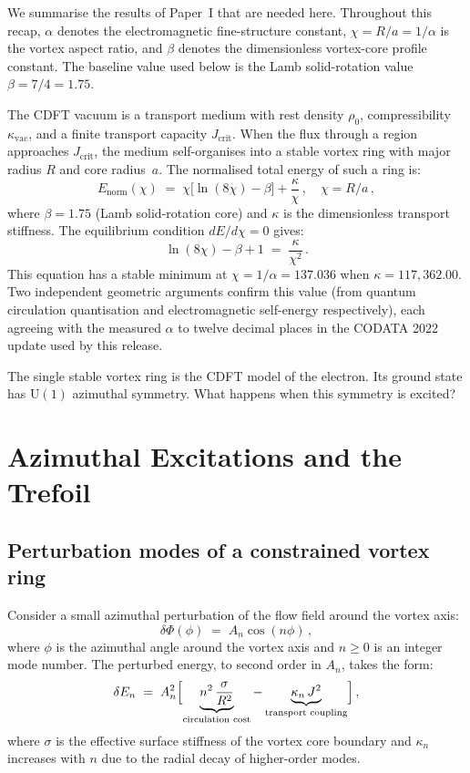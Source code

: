 \documentclass[11pt]{article}
\begin{document}
We summarise the results of Paper~I that are needed here.
Throughout this recap, $\alpha$ denotes the electromagnetic fine-structure
constant, $\chi=R/a=1/\alpha$ is the vortex aspect ratio, and $\beta$ denotes
the dimensionless vortex-core profile constant. The baseline value used below is
the Lamb solid-rotation value $\beta=7/4=1.75$.

The CDFT vacuum is a transport medium with rest density $\rho_0$, compressibility
$\kappa_\text{vac}$, and a finite transport capacity $J_\text{crit}$.
When the flux through a region approaches $J_\text{crit}$, the medium self-organises
into a stable vortex ring with major radius $R$ and core radius~$a$.
The normalised total energy of such a ring is:
\begin{equation}
  E_\text{norm}(\chi) \;=\; \chi\bigl[\ln(8\chi) - \beta\bigr] + \frac{\kappa}{\chi}\,,
  \quad \chi = R/a\,,
  \label{eq:energy}
\end{equation}
where $\beta = 1.75$ (Lamb solid-rotation core) and $\kappa$ is the dimensionless
transport stiffness.
The equilibrium condition $dE/d\chi = 0$ gives:
\begin{equation}
  \ln(8\chi) - \beta + 1 \;=\; \frac{\kappa}{\chi^2}\,.
  \label{eq:equil}
\end{equation}
This equation has a stable minimum at $\chi = 1/\alpha = 137.036$ when
$\kappa = 117{,}362.00$.
Two independent geometric arguments confirm this value
(from quantum circulation quantisation and electromagnetic self-energy respectively),
each agreeing with the measured $\alpha$ to twelve decimal places in the
CODATA 2022 update used by this release.

The single stable vortex ring is the CDFT model of the electron.
Its ground state has $\mathrm{U}(1)$ azimuthal symmetry.
What happens when this symmetry is excited?


\section{Azimuthal Excitations and the Trefoil}
\label{sec:topology}

\subsection{Perturbation modes of a constrained vortex ring}

Consider a small azimuthal perturbation of the flow field around the vortex axis:
\begin{equation}
  \delta\Phi(\phi) \;=\; A_n \cos(n\phi)\,,
  \label{eq:perturbation}
\end{equation}
where $\phi$ is the azimuthal angle around the vortex axis and $n \geq 0$ is an
integer mode number.
The perturbed energy, to second order in $A_n$, takes the form:
\begin{equation}
  \delta E_n \;=\; A_n^2\Bigl[\underbrace{n^2\,\frac{\sigma}{R^2}}_{\text{circulation cost}}
                              - \underbrace{\kappa_n\,J^2}_{\text{transport coupling}}\Bigr]\,,
  \label{eq:dE_n}
\end{equation}
where $\sigma$ is the effective surface stiffness of the vortex core boundary
and $\kappa_n$ increases with $n$ due to the radial decay of higher-order modes.
\end{document}
